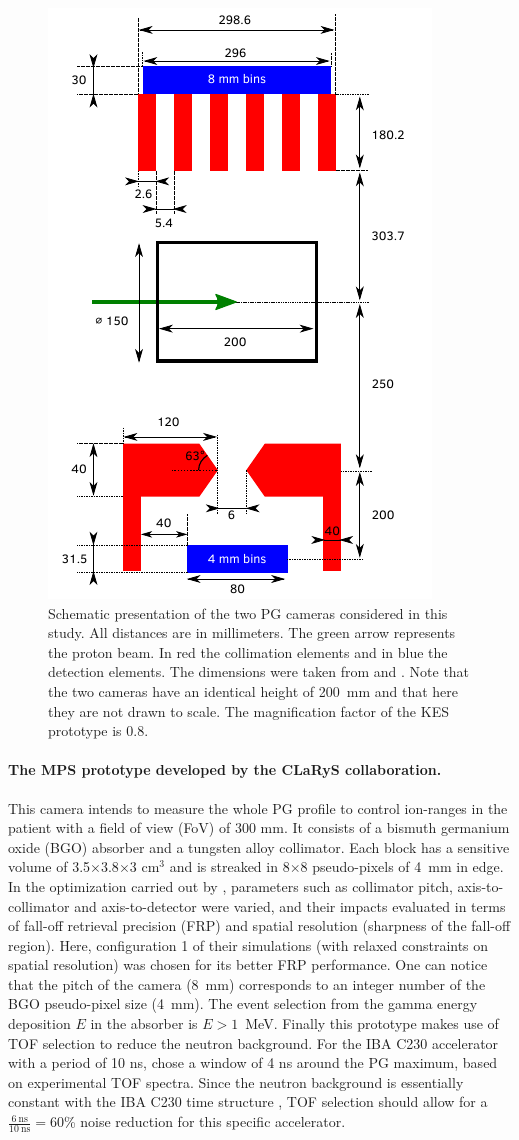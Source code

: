 \documentclass[a4paper,english,12pt]{article}
\begin{document}
\begin{figure}
  \centering
  \includegraphics[width=0.5\linewidth]{detectors_cyl2}
	\caption{Schematic presentation of the two PG cameras considered in this study. All distances are in millimeters. The green arrow represents the proton beam. In red the collimation elements and in blue the detection elements. The dimensions were taken from \cite{Pinto2014a} and \cite{Perali2014,Sterpin2015}. Note that the two cameras have an identical height of 200~mm and that here they are not drawn to scale. The magnification factor of the KES prototype is 0.8.}
  \label{fig:detectors}
\end{figure}

\paragraph{The MPS prototype developed by the CLaRyS collaboration.}
This camera intends to measure the whole PG profile to control ion-ranges in the patient with a field of view (FoV) of 300 mm. It consists of a bismuth germanium oxide (BGO) absorber and a tungsten alloy collimator. Each block has a sensitive volume of 3.5$\times$3.8$\times$3 cm$^{3}$ and is streaked in 8$\times$8 pseudo-pixels of 4~mm in edge. In the optimization carried out by \cite{Pinto2014a}, parameters such as collimator pitch, axis-to-collimator and axis-to-detector were varied, and their impacts evaluated in terms of fall-off retrieval precision (FRP) and spatial resolution (sharpness of the fall-off region). Here, configuration 1 of their simulations (with relaxed constraints on spatial resolution) was chosen for its better FRP performance. One can notice that the pitch of the camera (8~mm) corresponds to an integer number of the BGO pseudo-pixel size (4~mm). The event selection from the gamma energy deposition $E$ in the absorber is $E>1$~MeV. Finally this prototype makes use of TOF selection to reduce the neutron background. For the IBA C230 accelerator with a period of 10 ns, \cite{Pinto2014a} chose a window of 4 ns around the PG maximum, based on experimental TOF spectra. Since the neutron background is essentially constant with the IBA C230 time structure \citep{Pinto2014a}, TOF selection should allow for a $\frac{6~\text{ns}}{10~\text{ns}}=60$\% noise reduction for this specific accelerator.
\end{document}
